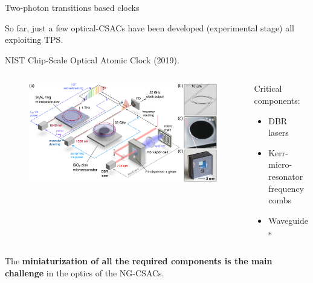 \begin{frame}{Two-photon transitions based clocks}

    So far, just a few optical-CSACs have been developed (experimental stage) all exploiting TPS.

    \vspace{10pt}

    NIST Chip-Scale Optical Atomic Clock (2019).

    \begin{columns}[c, onlytextwidth]

        \begin{column}{0.65\textwidth}

            \begin{figure}
                \centering
                \includegraphics[width=\textwidth]{img/NIST-optical.jpeg}
            \end{figure}

        \end{column}

        \hfill

        \begin{column}{0.32\textwidth}

            Critical components:

            \begin{itemize}
                \item DBR lasers
                \item Kerr-micro-resonator frequency combs
                \item Waveguides
            \end{itemize}

        \end{column}

    \end{columns}

    \vspace{10pt}

    The \textbf{miniaturization of all the required components is the main challenge} in the optics of the NG-CSACs.

\end{frame}



